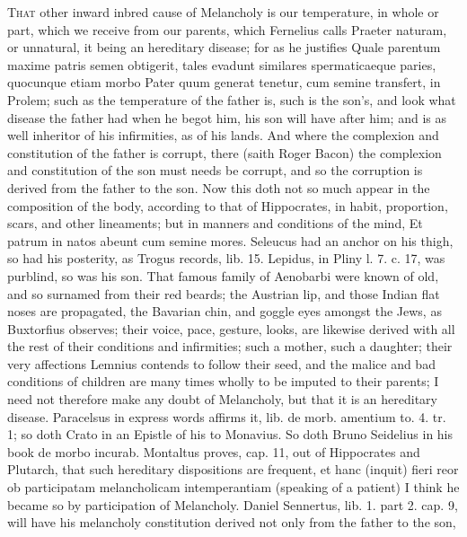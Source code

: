 {\lettrine{T}{hat} other inward inbred cause of Melancholy is our temperature, in
whole or part, which we receive from our parents, which Fernelius
calls Praeter naturam, or unnatural, it being an hereditary disease;
for as he justifies Quale parentum maxime patris semen obtigerit,
tales evadunt similares spermaticaeque paries, quocunque etiam morbo
Pater quum generat tenetur, cum semine transfert, in Prolem; such as
the temperature of the father is, such is the son's, and look what
disease the father had when he begot him, his son will have after him;
and is as well inheritor of his infirmities, as of his lands. And
where the complexion and constitution of the father is corrupt, there
(saith Roger Bacon) the complexion and constitution of the son
must needs be corrupt, and so the corruption is derived from the father
to the son. Now this doth not so much appear in the composition of the
body, according to that of Hippocrates, in habit, proportion,
scars, and other lineaments; but in manners and conditions of the mind,
Et patrum in natos abeunt cum semine mores.
Seleucus had an anchor on his thigh, so had his posterity, as Trogus
records, lib. 15. Lepidus, in Pliny l. 7. c. 17, was purblind, so was
his son. That famous family of Aenobarbi were known of old, and so
surnamed from their red beards; the Austrian lip, and those Indian flat
noses are propagated, the Bavarian chin, and goggle eyes amongst the
Jews, as  Buxtorfius observes; their voice, pace, gesture, looks,
are likewise derived with all the rest of their conditions and
infirmities; such a mother, such a daughter; their very
affections Lemnius contends to follow their seed, and the malice
and bad conditions of children are many times wholly to be imputed to
their parents; I need not therefore make any doubt of Melancholy, but
that it is an hereditary disease.  Paracelsus in express words
affirms it, lib. de morb. amentium to. 4. tr. 1; so doth Crato in
an Epistle of his to Monavius. So doth Bruno Seidelius in his book de
morbo incurab. Montaltus proves, cap. 11, out of Hippocrates and
Plutarch, that such hereditary dispositions are frequent, et hanc
(inquit) fieri reor ob participatam melancholicam intemperantiam
(speaking of a patient) I think he became so by participation of
Melancholy. Daniel Sennertus, lib. 1. part 2. cap. 9, will have his
melancholy constitution derived not only from the father to the son,
}
